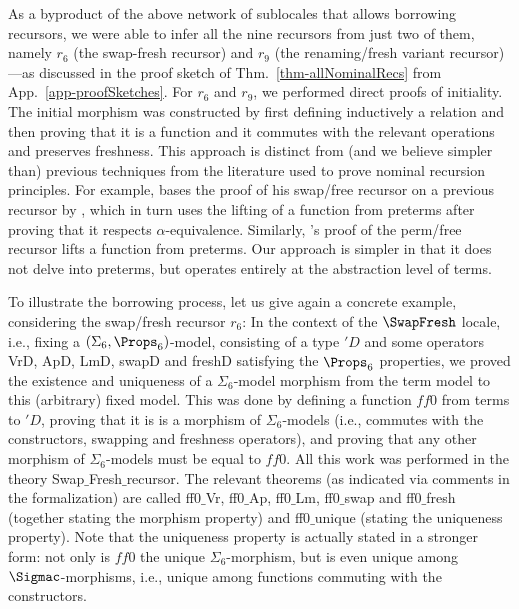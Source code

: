 As a byproduct of the above network of sublocales that allows borrowing recursors, we were able to infer all the nine recursors from just two of them, namely $r_6$ (the swap-fresh recursor) and $r_9$ (the renaming/fresh variant recursor)---as discussed in the proof sketch of Thm.~\ref{thm-allNominalRecs} from 
App.~\ref{app-proofSketches}.  For $r_6$ and $r_9$, we performed direct proofs of initiality. The initial morphism was constructed by first defining inductively a relation and then proving that it is a function and it commutes with the relevant operations and preserves freshness. This approach is distinct from (and we believe simpler than) previous techniques from the literature used to prove nominal recursion  principles. For example, \citet{primrecFOAS-Norrish04} bases the proof of his swap/free recursor on a previous recursor by %
 \citet{DBLP:conf/tphol/GordonM96}, which in turn uses the lifting of a function from preterms after proving that it respects $\alpha$-equivalence. Similarly, %
  \citet{pitts-AlphaStructural}'s proof of the perm/free recursor lifts a function from preterms. 
Our approach is simpler in that it does not delve into preterms, but operates entirely at the abstraction level of terms. 

To illustrate the borrowing process, let us give again a concrete example, considering the swap/fresh recursor $r_6$: In the context of the $\SwapFresh$ locale, i.e., fixing a $(\Sigma_6,\Props_6)$-model, consisting of a type $'D$ and some operators 
\textsf{VrD}, \textsf{ApD}, \textsf{LmD}, \textsf{swapD} and \textsf{freshD} satisfying the $\Props_6$ properties, we proved the existence and uniqueness of a $\Sigma_6$-model morphism from the term model to this (arbitrary) fixed model. This was done by defining a function $ff0$ from terms to $'D$, proving that it is is a morphism of $\Sigma_6$-models (i.e., commutes with the constructors, swapping and freshness operators), and proving that any other morphism of $\Sigma_6$-models must be equal to $ff0$. All this work was performed in the theory \textsf{Swap$\_$\allowbreak{}Fresh$\_$\allowbreak{}recursor}. The relevant theorems (as indicated via comments in the formalization) are called \textsf{ff0$\_$\allowbreak{}Vr}, \textsf{ff0$\_$\allowbreak{}Ap}, \textsf{ff0$\_$\allowbreak{}Lm}, \textsf{ff0$\_$\allowbreak{}swap} and \textsf{ff0$\_$\allowbreak{}fresh} (together stating the morphism property) and \textsf{ff0$\_$\allowbreak{}unique} (stating the uniqueness property). Note that the uniqueness property is actually stated in a stronger form: not only is $ff0$ the unique $\Sigma_6$-morphism, but is even unique among $\Sigmac$-morphisms, i.e., unique among functions commuting with the constructors. 

